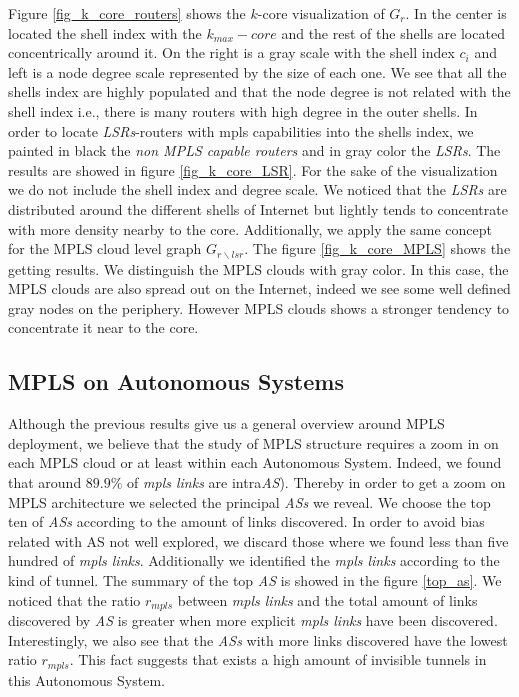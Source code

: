 Figure \ref{fig_k_core_routers} shows the $k$-core visualization of $G_{r}$. In the center is located the shell index with the $k_{max}-core$ and the rest of the shells are located concentrically around it. On the right is a gray scale with the shell index $c_i$ and left is a node degree scale represented by the size of each one. We see that all the shells index are highly populated and that the node degree is not related with the shell index i.e., there is many routers with high degree in the outer shells. In order to locate \textit{LSRs}-routers with mpls capabilities into the shells index, we painted in black the  \textit{non MPLS capable routers} and in gray color the \textit{LSRs}. The results are showed in figure \ref{fig_k_core_LSR}. For the sake of the visualization we do not include the shell index and degree scale. We noticed that the \textit{LSRs} are distributed around the different shells of Internet but  lightly tends to concentrate with more density nearby to the core. Additionally, we apply the same concept for the MPLS cloud level graph $G_{r\backslash lsr}$. The figure \ref{fig_k_core_MPLS} shows the getting results. We distinguish the MPLS clouds with gray color. In this case, the MPLS clouds  are also spread out on the Internet, indeed we see some well defined gray nodes on the periphery. However MPLS clouds shows a stronger tendency to concentrate it near to the core.

\subsection{MPLS on Autonomous Systems}

Although the previous results give us a general overview around MPLS deployment, we believe that the study of MPLS structure requires a zoom in on each MPLS cloud or at least within each Autonomous System. Indeed, we found that around $89.9\%$ of \textit{mpls links} are intra\textit{AS}).  Thereby in order to get a zoom on MPLS architecture we selected the principal \textit{ASs} we reveal. We choose the top ten of \textit{ASs} according to the amount of  links discovered. In order to avoid bias related with AS not well explored,  we discard those where we found less than five hundred of \textit{mpls links}. Additionally we identified the \textit{mpls links} according to the kind of tunnel. The summary of the top \textit{AS} is showed in the figure \ref{top_as}. We noticed that the ratio $r_{mpls}$ between \textit{mpls links} and the total amount of links discovered by \textit{AS} is greater when more explicit \textit{mpls links} have been discovered. Interestingly, we also see that the \textit{ASs} with more links discovered have the lowest ratio $r_{mpls}$. This fact suggests that exists a high amount of invisible tunnels in this Autonomous System.


